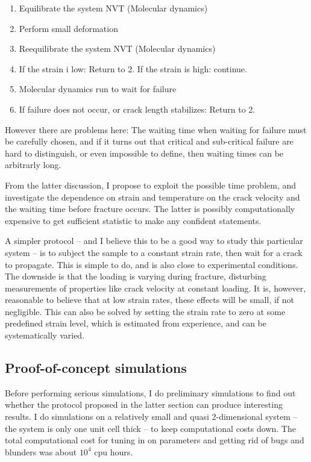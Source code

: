\begin{enumerate}
\item Equilibrate the system NVT (Molecular dynamics)
\item Perform small deformation
\item Reequilibrate the system NVT (Molecular dynamics)
\item If the strain i low: Return to 2. If the strain is high: continue.
\item Molecular dynamics run to wait for failure
\item If failure does not occur, or crack length stabilizes: Return to 2. 
\end{enumerate}

However there are problems here: The waiting time when waiting for failure must be carefully chosen, and if it turns out that critical and sub-critical failure are hard to distinguish, or even impossible to define, then waiting times can be arbitrarly long. 

From the latter discussion, I propose to exploit the possible time problem, and investigate the dependence on strain and temperature on the crack velocity and the waiting time before fracture occurs. The latter is possibly computationally expensive to get sufficient statistic to make any confident statements. 

A simpler protocol -- and I believe this to be a good way to study this particular system -- is to subject the sample to a constant strain rate, then wait for a crack to propagate. This is simple to do, and is also close to experimental conditions. The downside is that the loading is varying during fracture, disturbing measurements of properties like crack velocity at constant loading. It is, however, reasonable to believe that at low strain rates, these effects will be small, if not negligible. This can also be solved by setting the strain rate to zero at some predefined strain level, which is estimated from experience, and can be systematically varied. 


\subsection{Proof-of-concept simulations}
Before performing serious simulations, I do preliminary simulations to find out whether the protocol proposed in the latter section can produce interesting results. I do simulations on a relatively small and quasi 2-dimensional system -- the system is only one unit cell thick -- to keep computational costs down. The total computational cost for tuning in on parameters and getting rid of bugs and blunders was about $10^4$ cpu hours.

